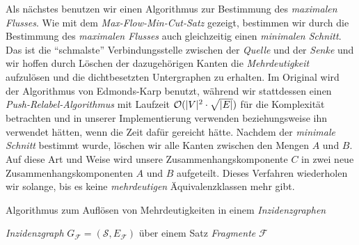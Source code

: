 Als nächstes benutzen wir einen Algorithmus zur Bestimmung des \emph{maximalen Flusses}. Wie mit dem \emph{Max-Flow-Min-Cut-Satz} gezeigt, bestimmen wir durch die Bestimmung des \emph{maximalen Flusses} auch gleichzeitig einen \emph{minimalen Schnitt}. Das ist die \enquote{schmalste} Verbindungsstelle zwischen der \emph{Quelle} und der \emph{Senke} und wir hoffen durch Löschen der dazugehörigen Kanten die \emph{Mehrdeutigkeit} aufzulösen und die dichtbesetzten Untergraphen zu erhalten. Im Original wird der Algorithmus von Edmonds-Karp benutzt, während wir stattdessen einen \emph{Push-Relabel-Algorithmus} mit Laufzeit \emph{$\mathcal{O}(|V|^2\cdot \sqrt{|E|})$} für die Komplexität betrachten und in unserer Implementierung verwenden beziehungsweise ihn verwendet hätten, wenn die Zeit dafür gereicht hätte. Nachdem der \emph{minimale Schnitt} bestimmt wurde, löschen wir alle Kanten zwischen den Mengen $A$ und $B$. Auf diese Art und Weise wird unsere Zusammenhangskomponente $C$ in zwei neue Zusammenhangskomponenten $A$ und $B$ aufgeteilt. Dieses Verfahren wiederholen wir solange, bis es keine \emph{mehrdeutigen} Äquivalenzklassen mehr gibt.  


\begin{algorithm}
	\caption{Algorithmus zum Auflösen von Mehrdeutigkeiten in einem \emph{Inzidenzgraphen}}
	\label{alg:amb_res}
	\begin{algorithmic}[1]
		\Require \emph{Inzidenzgraph} $G_{\mathcal{F}} = (\mathcal{S},E_{\mathcal{F}})$ über einem Satz \emph{Fragmente} $\mathcal{F}$
				\EndWhile
			\EndWhile
		\EndProcedure
	\end{algorithmic}
\end{algorithm}

